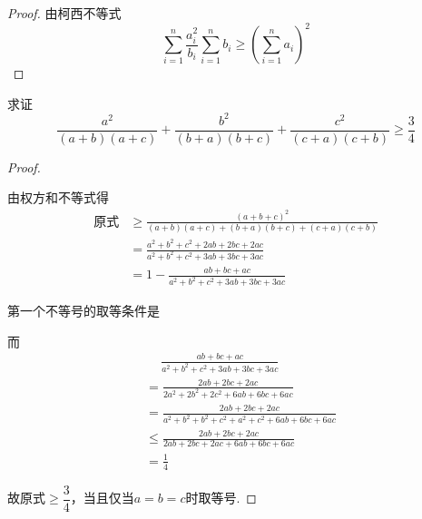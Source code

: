 \begin{proof}
    由柯西不等式
    \[\sum_{i=1}^{n}\frac{a_i^2}{b_i}\sum_{i=1}^{n}b_i\geq(\sum_{i=1}^{n}a_i)^2\]
\end{proof}
\begin{example}
    求证\[\frac{a^2}{(a+b)(a+c)}+\frac{b^2}{(b+a)(b+c)}+\frac{c^2}{(c+a)(c+b)}\geq \frac{3}{4}\]
\end{example}
\begin{proof}
        \ 
        
        由权方和不等式得
        \begin{align*}
        \text{原式}&\geq \frac{(a+b+c)^2}{(a+b)(a+c)+(b+a)(b+c)+(c+a)(c+b)}\\   
                 &=\frac{a^2+b^2+c^2+2ab+2bc+2ac}{a^2+b^2+c^2+3ab+3bc+3ac}\\
                 &=1-\frac{ab+bc+ac}{a^2+b^2+c^2+3ab+3bc+3ac}
        \end{align*}
        
        第一个不等号的取等条件是
        
        而
        \begin{align*}
        &\quad\ \frac{ab+bc+ac}{a^2+b^2+c^2+3ab+3bc+3ac}\\
        &=\frac{2ab+2bc+2ac}{2a^2+2b^2+2c^2+6ab+6bc+6ac}\\
        &=\frac{2ab+2bc+2ac}{a^2+b^2+b^2+c^2+a^2+c^2+6ab+6bc+6ac}\\
        &\leq \frac{2ab+2bc+2ac}{2ab+2bc+2ac+6ab+6bc+6ac}\\
        &=\frac{1}{4}
        \end{align*}
        
        故原式$\geq \dfrac{3}{4}$，当且仅当$a=b=c$时取等号.
        
\end{proof}
\clearpage

